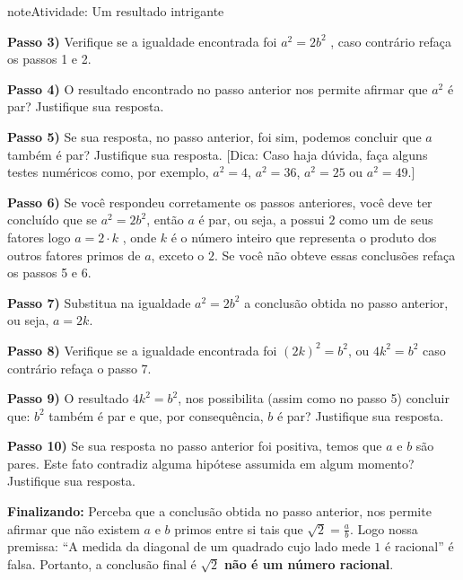 \begin{sphinxadmonition}{note}{Atividade: Um resultado intrigante}
\begin{enumerate}
\textbf{Passo 3)} Verifique se a igualdade encontrada foi \(a^2=2b^2\) , caso contrário refaça os passos 1 e 2.

\textbf{Passo 4)} O resultado encontrado no passo anterior nos permite afirmar que \(a^2\) é par? Justifique sua resposta.

\textbf{Passo 5)} Se sua resposta, no passo anterior, foi sim, podemos concluir que \(a\) também é par? Justifique sua resposta. {[}Dica: Caso haja dúvida, faça alguns testes numéricos como, por exemplo, \(a^2 = 4\), \(a^2 = 36\), \(a^2 = 25\) ou \(a^2 = 49\).{]}

\textbf{Passo 6)} Se você respondeu corretamente os passos anteriores, você deve ter concluído que se \(a^2=2b^2\), então \(a\) é par, ou seja, a possui \(2\) como um de seus fatores logo \(a = 2 \cdot k\) , onde \(k\) é o número inteiro que representa o produto dos outros fatores primos de \(a\), exceto o \(2\). Se você não obteve essas conclusões refaça os passos 5 e 6.

\textbf{Passo 7)} Substitua na igualdade \(a^2=2b^2\) a conclusão obtida no passo anterior, ou seja, \(a = 2k\).

\textbf{Passo 8)} Verifique se a igualdade encontrada foi \((2k)^2=b^2\), ou \(4k^2=b^2\) caso contrário refaça o passo 7.

\textbf{Passo 9)} O resultado \(4k^2=b^2\), nos possibilita (assim como no passo 5) concluir que:  \(b^2\) também é par e que, por consequência, \(b\) é par? Justifique sua resposta.

\textbf{Passo 10)} Se sua resposta no passo anterior foi positiva, temos que \(a\) e \(b\) são pares. Este fato contradiz alguma hipótese assumida em algum momento? Justifique sua resposta.

\textbf{Finalizando:} Perceba que a conclusão obtida no passo anterior, nos permite afirmar que não existem \(a\) e \(b\) primos entre si tais que \(\sqrt{2} =\frac{a}{b}\). Logo nossa premissa: “A medida da diagonal de um quadrado cujo lado mede \(1\) é racional” é falsa. Portanto, a conclusão final é \(\sqrt{2}\) \textbf{não é um número racional}.

\end{enumerate}
\end{sphinxadmonition}

